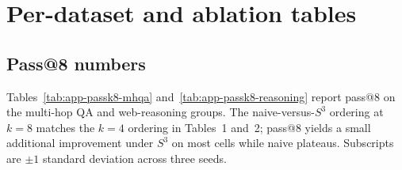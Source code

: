 
\section{Per-dataset and ablation tables}
\label{sec:appendix-data}

\subsection{Pass@8 numbers}
\label{app:passk8}

Tables~\ref{tab:app-passk8-mhqa} and~\ref{tab:app-passk8-reasoning}
report pass@8 on the multi-hop QA and web-reasoning groups. The
naive-versus-$S^3$ ordering at $k{=}8$ matches the $k{=}4$ ordering
in Tables~1 and~2; pass@8 yields a small additional improvement
under $S^3$ on most cells while naive plateaus. Subscripts are
$\pm 1$ standard deviation across three seeds.

